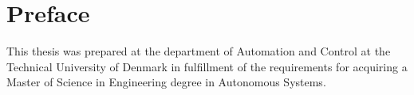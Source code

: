 \chapter{Preface}
This thesis was prepared at the department of Automation and Control at the Technical University of Denmark in fulfillment of the requirements for acquiring a Master of Science in Engineering degree in Autonomous Systems.

\vfill

\iffalse
{
\centering
    \thesislocation{}, \today\\[1cm]
\begin{flushright}
    \thesisauthor{}
\end{flushright}
}
\fi